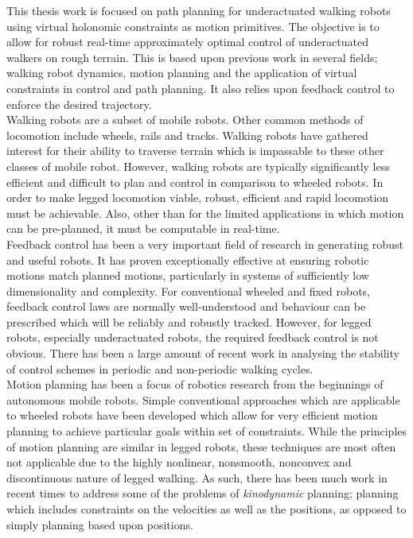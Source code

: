 This thesis work is focused on path planning for underactuated walking robots using virtual holonomic constraints as motion primitives. The objective is to allow for robust real-time approximately optimal control of underactuated walkers on rough terrain. This is based upon previous work in several fields; walking robot dynamics, motion planning and the application of virtual constraints in control and path planning. It also relies upon feedback control to enforce the desired trajectory. \\

Walking robots are a subset of mobile robots. Other common methods of locomotion include wheels, rails and tracks. Walking robots have gathered interest for their ability to traverse terrain which is impassable to these other classes of mobile robot. However, walking robots are typically significantly less efficient and difficult to plan and control in comparison to wheeled robots. In order to make legged locomotion viable, robust, efficient and rapid locomotion must be achievable. Also, other than for the limited applications in which motion can be pre-planned, it must be computable in real-time. \\

Feedback control has been a very important field of research in generating robust and useful robots. It has proven exceptionally effective at ensuring robotic motions match planned motions, particularly in systems of sufficiently low dimensionality and complexity. For conventional wheeled and fixed robots, feedback control laws are normally well-understood and behaviour can be prescribed which will be reliably and robustly tracked. However, for legged robots, especially underactuated robots, the required feedback control is not obvious. There has been a large amount of recent work in analysing the stability of control schemes in periodic and non-periodic walking cycles. \\

Motion planning has been a focus of robotics research from the beginnings of autonomous mobile robots. Simple conventional approaches which are applicable to wheeled robots have been developed which allow for very efficient motion planning to achieve particular goals within set of constraints. While the principles of motion planning are similar in legged robots, these techniques are most often not applicable due to the highly nonlinear, nonsmooth, nonconvex and discontinuous nature of legged walking. As such, there has been much work in recent times to address some of the problems of \textit{kinodynamic} planning; planning which includes constraints on the velocities as well as the positions, as opposed to simply planning based upon positions. \\


